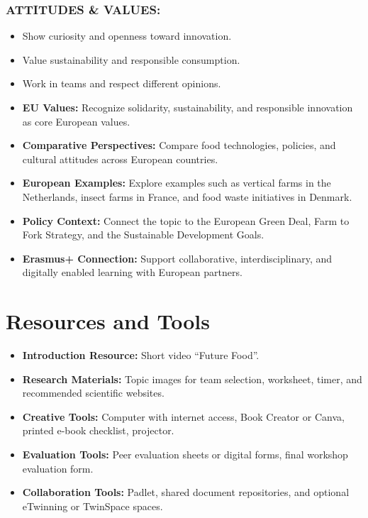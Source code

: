 \documentclass[11pt, a4paper]{article}
\begin{document}
\subsubsection*{ATTITUDES \& VALUES:}
\begin{itemize}
    \item Show curiosity and openness toward innovation.
    \item Value sustainability and responsible consumption.
    \item Work in teams and respect different opinions.
\end{itemize}

\begin{eurobox}
\begin{itemize}
    \item \textbf{EU Values:} Recognize solidarity, sustainability, and responsible innovation as core European values.
    \item \textbf{Comparative Perspectives:} Compare food technologies, policies, and cultural attitudes across European countries.
    \item \textbf{European Examples:} Explore examples such as vertical farms in the Netherlands, insect farms in France, and food waste initiatives in Denmark.
    \item \textbf{Policy Context:} Connect the topic to the European Green Deal, Farm to Fork Strategy, and the Sustainable Development Goals.
    \item \textbf{Erasmus+ Connection:} Support collaborative, interdisciplinary, and digitally enabled learning with European partners.
\end{itemize}
\end{eurobox}

\newpage
\section{Resources and Tools}
\begin{itemize}
    \item \textbf{Introduction Resource:} Short video ``Future Food''.
    \item \textbf{Research Materials:} Topic images for team selection, worksheet, timer, and recommended scientific websites.
    \item \textbf{Creative Tools:} Computer with internet access, Book Creator or Canva, printed e-book checklist, projector.
    \item \textbf{Evaluation Tools:} Peer evaluation sheets or digital forms, final workshop evaluation form.
    \item \textbf{Collaboration Tools:} Padlet, shared document repositories, and optional eTwinning or TwinSpace spaces.
\end{itemize}
\end{document}
